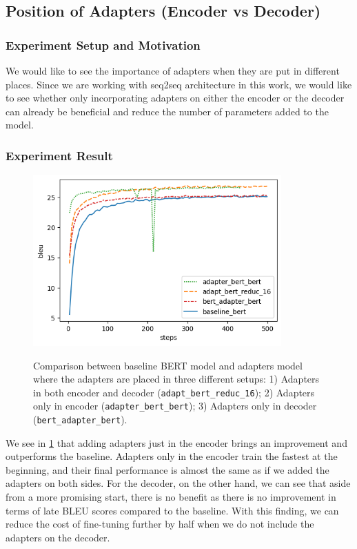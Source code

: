 \subsection{Position of Adapters (Encoder vs Decoder)}
\label{sec:posada}
\subsubsection{Experiment Setup and Motivation}
We would like to see the importance of adapters when they are put in different places. Since we are working with seq2seq architecture in this work, we would like to see whether only incorporating adapters on either the encoder or the decoder can already be beneficial and reduce the number of parameters added to the model.

\subsubsection{Experiment Result}
\begin{figure}[]
    {\includegraphics[width=0.85\textwidth]{img/bert_pos.png}}
    \centering
    \caption[Results of ablation study for adapters in the encoder or the decoder.]{Comparison between baseline BERT model and adapters model where the adapters are placed in three different setups: 1) Adapters in both encoder and decoder (\texttt{adapt\_bert\_reduc\_16}); 2) Adapters only in encoder (\texttt{adapter\_bert\_bert}); 3) Adapters only in decoder (\texttt{bert\_adapter\_bert}).}
    \label{img:adapt_bert_pos}
\end{figure}
We see in \cref{img:adapt_bert_pos} that adding adapters just in the encoder brings an improvement and outperforms the baseline. Adapters only in the encoder train the fastest at the beginning, and their final performance is almost the same as if we added the adapters on both sides. For the decoder, on the other hand, we can see that aside from a more promising start, there is no benefit as there is no improvement in terms of late BLEU scores compared to the baseline. With this finding, we can reduce the cost of fine-tuning further by half when we do not include the adapters on the decoder.

